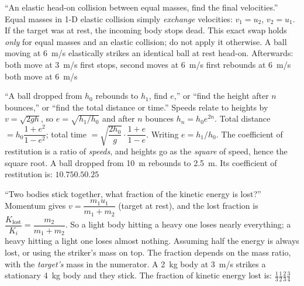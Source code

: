 {``An elastic head-on collision between equal masses, find the final velocities.''}
{Equal masses in 1-D elastic collision simply \emph{exchange} velocities: $v_1=u_2$, $v_2=u_1$.
If the target was at rest, the incoming body stops dead.}
{This exact swap holds \emph{only} for equal masses and an elastic collision; do not apply it
otherwise.}
{A ball moving at \SI{6}{m/s} elastically strikes an identical ball at rest head-on. Afterwards:}
{both move at \SI{3}{m/s}}
{first stops, second moves at \SI{6}{m/s}}
{first rebounds at \SI{6}{m/s}}
{both move at \SI{6}{m/s}}

{``A ball dropped from $h_0$ rebounds to $h_1$, find $e$,'' or ``find the height after $n$ bounces,''
or ``find the total distance or time.''}
{Speeds relate to heights by $v=\sqrt{2gh}$, so
$\boxed{e=\sqrt{h_1/h_0}}$ and after $n$ bounces $h_n=h_0e^{2n}$. Total distance
$=h_0\dfrac{1+e^2}{1-e^2}$; total time $=\sqrt{\dfrac{2h_0}{g}}\cdot\dfrac{1+e}{1-e}$.}
{Writing $e=h_1/h_0$. The coefficient of restitution is a ratio of \emph{speeds}, and heights go as the
\emph{square} of speed, hence the square root.}
{A ball dropped from \SI{10}{m} rebounds to \SI{2.5}{m}. Its coefficient of restitution is:}
{$1$}{$0.75$}{$0.5$}{$0.25$}

{``Two bodies stick together, what fraction of the kinetic energy is lost?''}
{Momentum gives $v=\dfrac{m_1u_1}{m_1+m_2}$ (target at rest), and the lost fraction is
$\boxed{\dfrac{K_{\text{lost}}}{K_i}=\dfrac{m_2}{m_1+m_2}}$. So a light body hitting a heavy one loses nearly
everything; a heavy hitting a light one loses almost nothing.}
{Assuming half the energy is always lost, or using the striker's mass on top. The fraction depends on
the mass ratio, with the \emph{target's} mass in the numerator.}
{A \SI{2}{kg} body at \SI{3}{m/s} strikes a stationary \SI{4}{kg} body and they stick. The fraction of
kinetic energy lost is:}
{$\tfrac13$}{$\tfrac12$}{$\tfrac23$}{$\tfrac34$}

